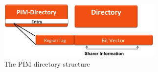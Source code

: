 \begin{figure}[h]
  \centering
  \includegraphics[width=3.2in]{figures/pimDirectory.pdf}
  \caption{The PIM directory structure}
  \label{fig:profile}
\end{figure}

